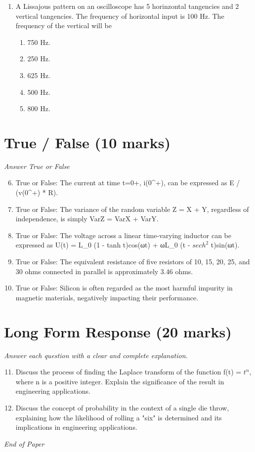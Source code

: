 \documentclass[12pt]{article}
\begin{document}
\begin{enumerate}[label=\arabic*.]
\begin{enumerate}[label=(\alph*)]
    \item [z / (1 + z)]
    \item [$z^2$ / (z - 1)]
    \item [1 / (2 - z)]
    \item [(z - 1) / z]
\end{enumerate}
\item A Lissajous pattern on an oscilloscope has 5 horinzontal tangencies and 2 vertical tangencies. The frequency of horizontal input is 100 Hz. The frequency of the vertical will be
\begin{enumerate}[label=(\alph*)]
    \item 750 Hz.
    \item 250 Hz.
    \item 625 Hz.
    \item 500 Hz.
    \item 800 Hz.
\end{enumerate}
\end{enumerate}

\section*{True / False (10 marks)}
\textit{Answer True or False}
\begin{enumerate}[label=\arabic*.]
\setcounter{enumi}{5}
\item True or False: The current at time t=0+, i(0^+), can be expressed as E / (v(0^+) * R).
\item True or False: The variance of the random variable Z = X + Y, regardless of independence, is simply VarZ = VarX + VarY.
\item True or False: The voltage across a linear time-varying inductor can be expressed as U(t) = L\_0 (1 - tanh t)cos(ωt) + ωL\_0 (t - $sech^2$ t)sin(ωt).
\item True or False: The equivalent resistance of five resistors of 10, 15, 20, 25, and 30 ohms connected in parallel is approximately 3.46 ohms.
\item True or False: Silicon is often regarded as the most harmful impurity in magnetic materials, negatively impacting their performance.
\end{enumerate}

\section*{Long Form Response (20 marks)}
\textit{Answer each question with a clear and complete explanation.}
\begin{enumerate}[label=\arabic*.]
\setcounter{enumi}{10}
\item Discuss the process of finding the Laplace transform of the function f(t) = $t^n$, where n is a positive integer. Explain the significance of the result in engineering applications.
\item Discuss the concept of probability in the context of a single die throw, explaining how the likelihood of rolling a "six" is determined and its implications in engineering applications.
\end{enumerate}

\vfill
\noindent\textit{End of Paper}
\end{document}
